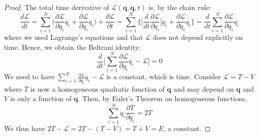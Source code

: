 \documentclass[a4paper]{article}
\theoremstyle{new}
\begin{document}
\begin{proof}
The total time derivative of $\mathcal{L}(\mathbf{q},\mathbf{\dot{q}},t)$ is, by the chain rule:
$$\frac{d\mathcal{L}}{dt}=\sum_{i=1}^N\bigg(\frac{\partial\mathcal{L}}{\partial q_i}\dot{q}_i+\frac{\partial\mathcal{L}}{\partial\dot{q}_i}\ddot{q}_i\bigg)+\frac{\partial\mathcal{L}}{\partial t}=\sum_{i=1}^N\bigg\{\bigg[\frac{d}{dt}\frac{\partial\mathcal{L}}{\partial\dot{q}_i}\bigg]\dot{q}_i+\frac{\partial\mathcal{L}}{\partial\dot{q}_i}\ddot{q}_i\bigg\}=\frac{d}{dt}\sum_{i=1}^N\frac{\partial\mathcal{L}}{\partial\dot{q}_i}\dot{q}_i$$
where we used Lagrange's equations and that $\mathcal{L}$ does not depend explicitly on time. Hence, we obtain the Beltrani identity:
$$\frac{d}{dt}\bigg[\sum_{i=1}^N\frac{\partial\mathcal{L}}{\partial\dot{q}_i}\dot{q}_i-\mathcal{L}\bigg]=0$$
We need to have $\sum_{i=1}^N\frac{\partial\mathcal{L}}{\partial\dot{q}_i}\dot{q}_i-\mathcal{L}$ is a constant, which is time. Consider $\mathcal{L}=T-V$ where $T$ is now a homogeneous quadratic function of $\mathbf{\dot{q}}$ and may depend on $\mathbf{q}$ and $V$ is only a function of $\mathbf{q}$. Then, by Euler's Theorem on homogeneous functions,
$$\sum_{i=1}^N\dot{q}_i\frac{\partial T}{\partial q_i}=2T$$
We thus have $2T-\mathcal{L}=2T-(T-V)=T+V=E$, a constant. 
\end{proof}
\newpage
\end{document}
